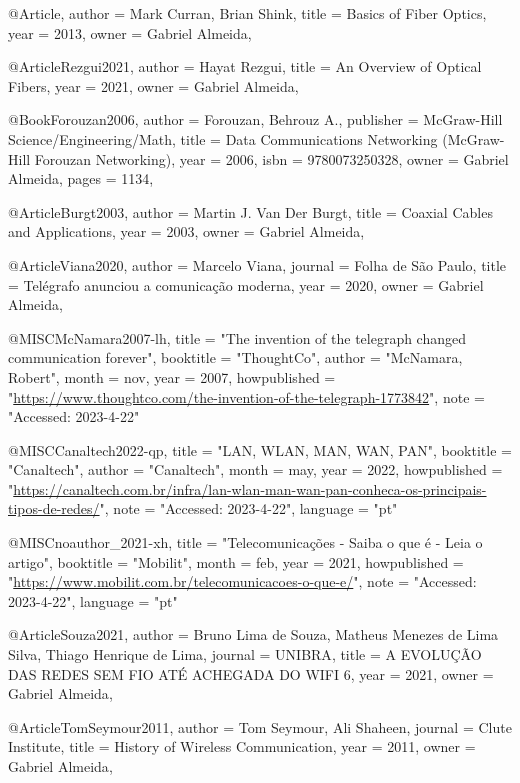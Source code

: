 @Article{,
	author = {Mark Curran, Brian Shink},
	title  = {Basics of Fiber Optics},
	year   = {2013},
	owner  = {Gabriel Almeida},
}

@Article{Rezgui2021,
	author = {Hayat Rezgui},
	title  = {An Overview of Optical Fibers},
	year   = {2021},
	owner  = {Gabriel Almeida},
}

@Book{Forouzan2006,
	author    = {Forouzan, Behrouz A.},
	publisher = {McGraw-Hill Science/Engineering/Math},
	title     = {Data Communications Networking (McGraw-Hill Forouzan Networking)},
	year      = {2006},
	isbn      = {9780073250328},
	owner     = {Gabriel Almeida},
	pages     = {1134},
}

@Article{Burgt2003,
	author = {Martin J. Van Der Burgt},
	title  = {Coaxial Cables and Applications},
	year   = {2003},
	owner  = {Gabriel Almeida},
}

@Article{Viana2020,
	author  = {Marcelo Viana},
	journal = {Folha de São Paulo},
	title   = {Telégrafo anunciou a comunicação moderna},
	year    = {2020},
	owner   = {Gabriel Almeida},
}

@MISC{McNamara2007-lh,
	title        = "The invention of the telegraph changed communication forever",
	booktitle    = "{ThoughtCo}",
	author       = "McNamara, Robert",
	month        =  nov,
	year         =  2007,
	howpublished = "\url{https://www.thoughtco.com/the-invention-of-the-telegraph-1773842}",
	note         = "Accessed: 2023-4-22"
}

@MISC{Canaltech2022-qp,
	title        = "{LAN}, {WLAN}, {MAN}, {WAN}, {PAN}",
	booktitle    = "Canaltech",
	author       = "{Canaltech}",
	month        =  may,
	year         =  2022,
	howpublished = "\url{https://canaltech.com.br/infra/lan-wlan-man-wan-pan-conheca-os-principais-tipos-de-redes/}",
	note         = "Accessed: 2023-4-22",
	language     = "pt"
}

@MISC{noauthor_2021-xh,
	title        = "Telecomunica{\c c}{\~o}es - Saiba o que {\'e} - Leia o artigo",
	booktitle    = "Mobilit",
	month        =  feb,
	year         =  2021,
	howpublished = "\url{https://www.mobilit.com.br/telecomunicacoes-o-que-e/}",
	note         = "Accessed: 2023-4-22",
	language     = "pt"
}

@Article{Souza2021,
	author  = {Bruno Lima de Souza, Matheus Menezes de Lima Silva, Thiago Henrique de Lima},
	journal = {UNIBRA},
	title   = {A EVOLUÇÃO DAS REDES SEM FIO ATÉ ACHEGADA DO WIFI 6},
	year    = {2021},
	owner   = {Gabriel Almeida},
}

@Article{TomSeymour2011,
	author  = {Tom Seymour, Ali Shaheen},
	journal = {Clute Institute},
	title   = {History of Wireless Communication},
	year    = {2011},
	owner   = {Gabriel Almeida},
}

